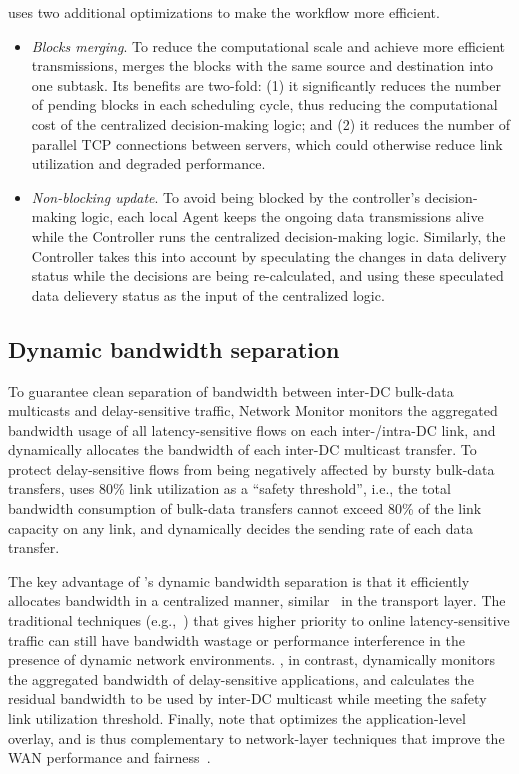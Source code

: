 \name uses two additional optimizations to make the workflow
more efficient.
\begin{itemize}
\item \emph{Blocks merging}.
To reduce the computational scale and achieve more efficient
transmissions, \name merges the blocks with the same source and
destination into one subtask. Its benefits are two-fold: (1) it
significantly reduces the number of pending blocks in each
scheduling cycle, thus reducing the computational cost of the
centralized decision-making logic; and (2) it reduces the number
of parallel TCP connections between servers, which could
otherwise reduce link utilization and degraded performance.
\item \emph{Non-blocking update}.
To avoid being blocked by the controller's decision-making logic,
each local Agent  keeps the ongoing data transmissions alive while
the Controller runs the centralized decision-making logic.
Similarly, the Controller takes this into account by speculating
the changes in data delivery status while the decisions are being
re-calculated, and using these speculated data delievery status as
the input of the centralized logic.
\end{itemize}

\subsection{Dynamic bandwidth separation}
\label{subsec:system:separation}

To guarantee clean separation of bandwidth between inter-DC
bulk-data multicasts and delay-sensitive traffic, \name Network
Monitor monitors the aggregated bandwidth usage of all
latency-sensitive flows on each inter-/intra-DC link, and
dynamically allocates the bandwidth of each inter-DC multicast
transfer. To protect delay-sensitive flows from being negatively
affected by bursty bulk-data transfers, \name uses 80\% link
utilization as a ``safety threshold'', i.e., the total bandwidth
consumption of bulk-data transfers cannot exceed 80\% of the link
capacity on any link, and dynamically decides the sending rate
of each data transfer.

The key advantage of \name's dynamic bandwidth separation is that it
efficiently allocates bandwidth in a centralized manner,
similar~\cite{kumar2015bwe} in the transport layer. The traditional
techniques (e.g.,~\cite{kumar2015bwe}) that gives higher priority to
online latency-sensitive traffic can still have bandwidth wastage or
performance interference in the presence of dynamic network
environments. \name, in contrast, dynamically monitors the aggregated
bandwidth of delay-sensitive applications, and calculates the
residual bandwidth to be used by inter-DC multicast while meeting the
safety link utilization threshold. Finally, note that \name optimizes
the application-level overlay, and is thus complementary to
network-layer techniques that improve the WAN performance and
fairness~\cite{chen2012design, kavulya2010analysis, mishra2010towards, reiss2012heterogeneity}.


